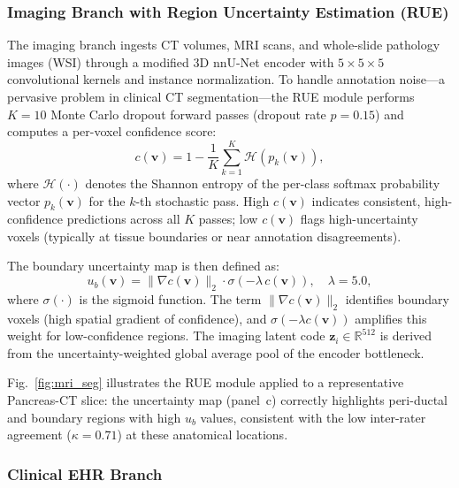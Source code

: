 \documentclass[a4paper,fleqn]{cas-dc}
\begin{document}
\subsubsection{Imaging Branch with Region Uncertainty Estimation (RUE)}

The imaging branch ingests CT volumes, MRI scans, and whole-slide pathology
images (WSI) through a modified 3D nnU-Net encoder \citep{isensee2021nnunet}
with $5\!\times\!5\!\times\!5$ convolutional kernels and instance
normalization. To handle annotation noise---a pervasive problem in clinical CT
segmentation---the RUE module performs $K\!=\!10$ Monte Carlo dropout forward
passes (dropout rate $p\!=\!0.15$) and computes a per-voxel confidence score:
\begin{equation}
c(\mathbf{v}) = 1 - \frac{1}{K}\sum_{k=1}^{K}
\mathcal{H}\!\left(p_k(\mathbf{v})\right),
\label{eq:confidence}
\end{equation}
where $\mathcal{H}(\cdot)$ denotes the Shannon entropy of the per-class
softmax probability vector $p_k(\mathbf{v})$ for the $k$-th stochastic pass.
High $c(\mathbf{v})$ indicates consistent, high-confidence predictions across
all $K$ passes; low $c(\mathbf{v})$ flags high-uncertainty voxels
(typically at tissue boundaries or near annotation disagreements).

The boundary uncertainty map is then defined as:
\begin{equation}
u_b(\mathbf{v}) = \bigl\|\nabla c(\mathbf{v})\bigr\|_2 \cdot
\sigma\!\left(-\lambda\, c(\mathbf{v})\right),\quad \lambda\!=\!5.0,
\label{eq:bunc}
\end{equation}
where $\sigma(\cdot)$ is the sigmoid function. The term
$\|\nabla c(\mathbf{v})\|_2$ identifies boundary voxels (high spatial
gradient of confidence), and $\sigma(-\lambda c(\mathbf{v}))$ amplifies this
weight for low-confidence regions. The imaging latent code
$\mathbf{z}_i \in \mathbb{R}^{512}$ is derived from the uncertainty-weighted
global average pool of the encoder bottleneck.

Fig.~\ref{fig:mri_seg} illustrates the RUE module applied to a representative
Pancreas-CT slice: the uncertainty map (panel~c) correctly highlights
peri-ductal and boundary regions with high $u_b$ values, consistent with the
low inter-rater agreement ($\kappa\!=\!0.71$) at these anatomical locations.

\subsubsection{Clinical EHR Branch}
\end{document}
